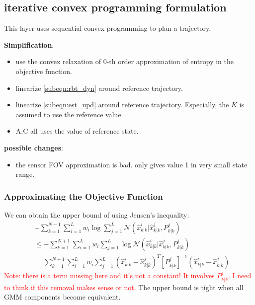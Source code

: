 \documentclass[letterpaper, 10 pt, conference]{ieeeconf}  %
\begin{document}
\subsection{iterative convex programming formulation}
This layer uses sequential convex programming to plan a trajectory. 

\textbf{Simplification}:
\begin{itemize}
	\item use the convex relaxation of $0$-th order approximation of entropy in the objective function.
	\item linearize \cref{subeqn:rbt_dyn} around reference trajectory.
	\item linearize \cref{subeqn:est_upd} around reference trajectory.  Especially, the $K$ is assumed to use the reference value.
	\item A,C all uses the value of reference state.
\end{itemize}

\textbf{possible changes}:
\begin{itemize}
	\item the sensor FOV approximation is bad. only gives value 1 in very small state range.
\end{itemize}

\subsubsection{Approximating the Objective Function}
We can obtain the upper bound of  using Jensen's inequality:
\begin{align*}
&-\sum\limits_{k=1}^{N+1} \sum\limits_{i=1}^{L}w_i\log \sum\limits_{j=1}^L\mathcal{N}(\hat{x}^i_{k|k}|\hat{x}^j_{k|k},P^j_{k|k})\\
&\leq -\sum\limits_{k=1}^{N+1} \sum\limits_{i=1}^{L}w_i \sum\limits_{j=1}^L\log\mathcal{N}(\hat{x}^i_{k|k}|\hat{x}^j_{k|k},P^j_{k|k})\\
&=\sum\limits_{k=1}^{N+1} \sum\limits_{i=1}^{L}w_i \sum\limits_{j=1}^L(\hat{x}^i_{k|k}-\hat{x}^j_{k|k})^T[P^j_{k|k}]^{-1}(\hat{x}^i_{k|k}-\hat{x}^j_{k|k})
\end{align*}
\textcolor{red}{Note: there is a term missing here and it's not a constant! It involves $P^j_{k|k}$. I need to think if this removal makes sense or not.}
The upper bound is tight when all GMM components become equivalent.
\end{document}
